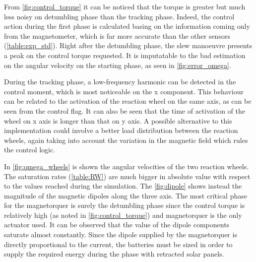 
From \autoref{fig:control_torque} it can be noticed that the torque is greater but much less noisy on detumbling phase than the tracking phase. Indeed, the control action during the first phase is calculated basing on the information coming only from the magnetometer, which is far more accurate than the other sensors (\autoref{table:exp_std}). Right after the detumbling phase, the slew manoeuvre presents a peak on the control torque requested. It is imputatable to the bad estimation on the angular velocity on the starting phase, as seen in \autoref{fig:error_omega}.

During the tracking phase, a low-frequency harmonic can be detected in the control moment, which is most noticeable on the x component. This behaviour can be related to the activation of the reaction wheel on the same axis, as can be seen from the control flag. It can also be seen that the time of activation of the wheel on x axis is longer than that on y axis. A possible alternative to this implementation could involve a better load distribution between the reaction wheels, again taking into account the variation in the magnetic field which rules the control logic.


In \autoref{fig:omega_wheels} is shown the angular velocities of the two reaction wheels. The saturation rates (\autoref{table:RW}) are much bigger in absolute value with respect to the values reached during the simulation.
The \autoref{fig:dipole} shows instead the magnitude of the magnetic dipoles along the three axis. The most critical phase for the magnetorquer is surely the detumbling phase since the control torque is relatively high (as noted in \autoref{fig:control_torque}) and magnetorquer is the only actuator used.
It can be observed that the value of the dipole components saturate almost constantly. Since the dipole supplied by the magnetorquer is directly proportional to the current, the batteries must be sized in order to supply the required energy during the phase with retracted solar panels.
